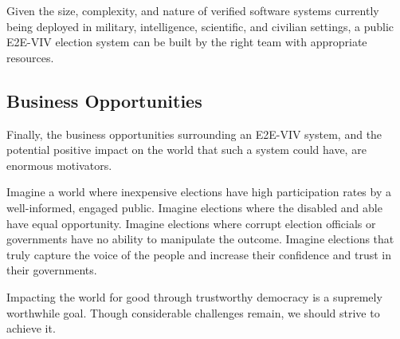 Given the size, complexity, and nature of verified software systems
currently being deployed in military, intelligence, scientific, and
civilian settings, a public E2E-VIV election system can be built by
the right team with appropriate resources.

\subsection{Business Opportunities}

Finally, the business opportunities surrounding an E2E-VIV
system, and the potential positive impact on the world that such a
system could have, are enormous motivators.

Imagine a world where inexpensive elections have high participation
rates by a well-informed, engaged public. Imagine elections where the
disabled and able have equal opportunity. Imagine elections where
corrupt election officials or governments have no ability to
manipulate the outcome. Imagine elections that truly capture the voice
of the people and increase their confidence and trust in their
governments.

Impacting the world for good through trustworthy democracy is a
supremely worthwhile goal. Though considerable challenges remain, we
should strive to achieve it.
